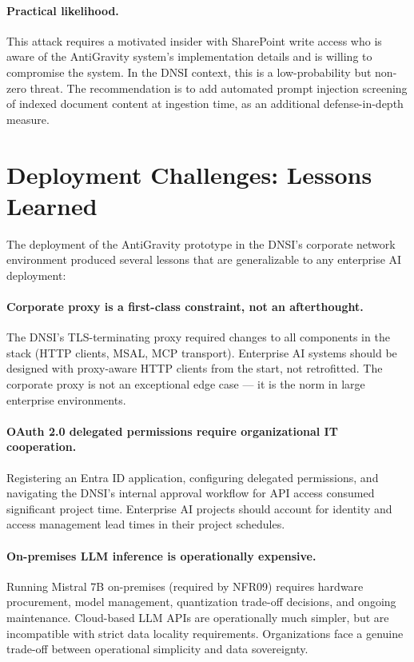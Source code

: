 \paragraph{Practical likelihood.} This attack requires a motivated insider with SharePoint write access who is aware of the AntiGravity system's implementation details and is willing to compromise the system. In the DNSI context, this is a low-probability but non-zero threat. The recommendation is to add automated prompt injection screening of indexed document content at ingestion time, as an additional defense-in-depth measure.

\section{Deployment Challenges: Lessons Learned}
\label{sec:disc-deployment}

The deployment of the AntiGravity prototype in the DNSI's corporate network environment produced several lessons that are generalizable to any enterprise AI deployment:

\paragraph{Corporate proxy is a first-class constraint, not an afterthought.} The DNSI's TLS-terminating proxy required changes to all components in the stack (HTTP clients, MSAL, MCP transport). Enterprise AI systems should be designed with proxy-aware HTTP clients from the start, not retrofitted. The corporate proxy is not an exceptional edge case --- it is the norm in large enterprise environments.

\paragraph{OAuth 2.0 delegated permissions require organizational IT cooperation.} Registering an Entra ID application, configuring delegated permissions, and navigating the DNSI's internal approval workflow for API access consumed significant project time. Enterprise AI projects should account for identity and access management lead times in their project schedules.

\paragraph{On-premises LLM inference is operationally expensive.} Running Mistral 7B on-premises (required by NFR09) requires hardware procurement, model management, quantization trade-off decisions, and ongoing maintenance. Cloud-based LLM APIs are operationally much simpler, but are incompatible with strict data locality requirements. Organizations face a genuine trade-off between operational simplicity and data sovereignty.

